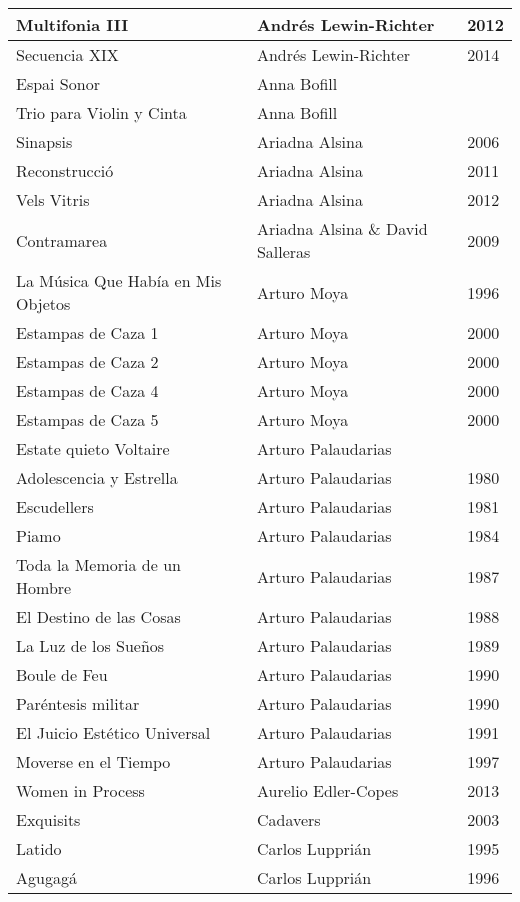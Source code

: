 \begin{center}
\begin{longtable}{| p{} | p{} | p{} |}
Multifonia III & Andrés Lewin-Richter & 2012 \\ \hline 
Secuencia XIX & Andrés Lewin-Richter & 2014 \\ \hline 
Espai Sonor & Anna Bofill &  \\ \hline 
Trio para Violin y Cinta & Anna Bofill &  \\ \hline 
Sinapsis & Ariadna Alsina & 2006 \\ \hline 
Reconstrucció & Ariadna Alsina & 2011 \\ \hline 
Vels Vitris & Ariadna Alsina & 2012 \\ \hline 
Contramarea & Ariadna Alsina \& David Salleras & 2009 \\ \hline 
La Música Que Había en Mis Objetos & Arturo Moya & 1996 \\ \hline 
Estampas de Caza 1 & Arturo Moya & 2000 \\ \hline 
Estampas de Caza 2 & Arturo Moya & 2000 \\ \hline 
Estampas de Caza 4 & Arturo Moya & 2000 \\ \hline 
Estampas de Caza 5 & Arturo Moya & 2000 \\ \hline 
Estate quieto Voltaire & Arturo Palaudarias &  \\ \hline 
Adolescencia y Estrella & Arturo Palaudarias & 1980 \\ \hline 
Escudellers & Arturo Palaudarias & 1981 \\ \hline 
Piamo & Arturo Palaudarias & 1984 \\ \hline 
Toda la Memoria de un Hombre & Arturo Palaudarias & 1987 \\ \hline 
El Destino de las Cosas & Arturo Palaudarias & 1988 \\ \hline 
La Luz de los Sueños & Arturo Palaudarias & 1989 \\ \hline 
Boule de Feu & Arturo Palaudarias & 1990 \\ \hline 
Paréntesis militar & Arturo Palaudarias & 1990 \\ \hline 
El Juicio Estético Universal & Arturo Palaudarias & 1991 \\ \hline 
Moverse en el Tiempo & Arturo Palaudarias & 1997 \\ \hline 
Women in Process & Aurelio Edler-Copes & 2013 \\ \hline 
Exquisits & Cadavers & 2003 \\ \hline 
Latido & Carlos Lupprián & 1995 \\ \hline 
Agugagá & Carlos Lupprián & 1996 \\ \hline 

\end{longtable}
\end{center}

